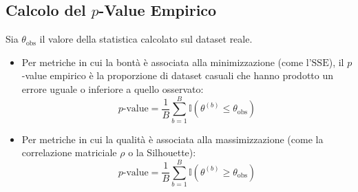 \subsection{Calcolo del $p$-Value Empirico}
Sia $\theta_{\mathrm{obs}}$ il valore della statistica calcolato sul dataset reale.
\begin{itemize}
    \item Per metriche in cui la bontà è associata alla minimizzazione (come l'$\mathrm{SSE}$), il $p$-value empirico è la proporzione di dataset casuali che hanno prodotto un errore uguale o inferiore a quello osservato:
    \begin{equation}
    \label{eq:dm-p-value-minimization}
    p\text{-value} = \frac{1}{B} \sum_{b=1}^B \mathbb{I}\left(\theta^{(b)} \le \theta_{\mathrm{obs}}\right)
    \end{equation}
    \item Per metriche in cui la qualità è associata alla massimizzazione (come la correlazione matriciale $\rho$ o la Silhouette):
    \begin{equation}
    \label{eq:dm-p-value-maximization}
    p\text{-value} = \frac{1}{B} \sum_{b=1}^B \mathbb{I}\left(\theta^{(b)} \ge \theta_{\mathrm{obs}}\right)
    \end{equation}
\end{itemize}

